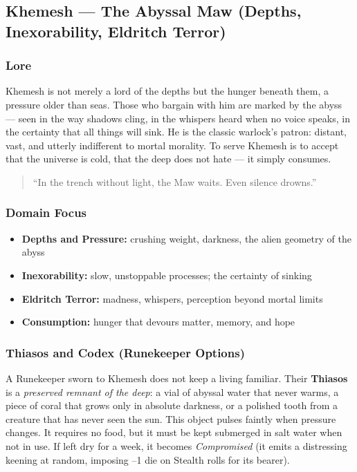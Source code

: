 
\subsection{Khemesh --- The Abyssal Maw (Depths, Inexorability, Eldritch Terror)}

\subsubsection*{Lore}
Khemesh is not merely a lord of the depths but the hunger beneath them, a pressure older than seas. Those who bargain with him are marked by the abyss --- seen in the way shadows cling, in the whispers heard when no voice speaks, in the certainty that all things will sink. He is the classic warlock's patron: distant, vast, and utterly indifferent to mortal morality. To serve Khemesh is to accept that the universe is cold, that the deep does not hate --- it simply consumes.

\begin{quote}
``In the trench without light, the Maw waits. Even silence drowns.''
\end{quote}

\subsubsection*{Domain Focus}
\begin{itemize}
  \item \textbf{Depths and Pressure:} crushing weight, darkness, the alien geometry of the abyss
  \item \textbf{Inexorability:} slow, unstoppable processes; the certainty of sinking
  \item \textbf{Eldritch Terror:} madness, whispers, perception beyond mortal limits
  \item \textbf{Consumption:} hunger that devours matter, memory, and hope
\end{itemize}

\subsubsection*{Thiasos and Codex (Runekeeper Options)}

A Runekeeper sworn to Khemesh does not keep a living familiar. Their \textbf{Thiasos} is a \textit{preserved remnant of the deep}: a vial of abyssal water that never warms, a piece of coral that grows only in absolute darkness, or a polished tooth from a creature that has never seen the sun. This object pulses faintly when pressure changes. It requires no food, but it must be kept submerged in salt water when not in use. If left dry for a week, it becomes \textit{Compromised} (it emits a distressing keening at random, imposing --1 die on Stealth rolls for its bearer).

